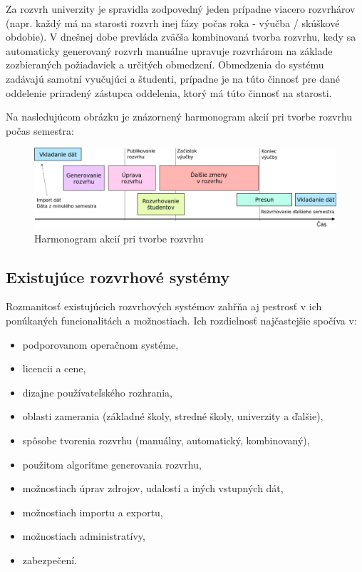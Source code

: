 Za rozvrh univerzity je spravidla zodpovedný jeden prípadne viacero rozvrhárov
(napr. každý má na starosti rozvrh inej fázy počas roka - výučba / skúškové obdobie).
V dnešnej dobe prevláda zväčša kombinovaná tvorba rozvrhu, kedy sa automaticky
generovaný rozvrh manuálne upravuje rozvrhárom na základe zozbieraných
požiadaviek a určitých obmedzení. Obmedzenia do systému zadávajú samotní
vyučujúci a študenti, prípadne je na túto činnosť pre dané oddelenie priradený
zástupca oddelenia, ktorý má túto činnosť na starosti.

Na nasledujúcom obrázku je znázornený harmonogram akcií pri tvorbe rozvrhu počas semestra:
\begin{figure}[ht]
  \centering
  \includegraphics[width=1\columnwidth]{img/course-timetabling.png}
  \caption{\label{fig:course_timetabling} Harmonogram akcií pri tvorbe rozvrhu \cite{unitime_hl}}
\end{figure}

\subsection{Existujúce rozvrhové systémy}
\label{subsec:existing_systems}

Rozmanitosť existujúcich rozvrhových systémov zahřňa aj pestrosť v ich ponúkaných funcionalitách
a možnostiach. Ich rozdielnosť najčastejšie spočíva v:
\begin{itemize}
\item podporovanom operačnom systéme,
\item licencii a cene,
\item dizajne používateľského rozhrania,
\item oblasti zamerania (základné školy, stredné školy, univerzity a ďalšie),
\item spôsobe tvorenia rozvrhu (manuálny, automatický, kombinovaný),
\item použitom algoritme generovania rozvrhu,
\item možnostiach úprav zdrojov, udalostí a iných vstupných dát,
\item možnostiach importu a exportu,
\item možnostiach administratívy,
\item zabezpečení.
\end{itemize}


